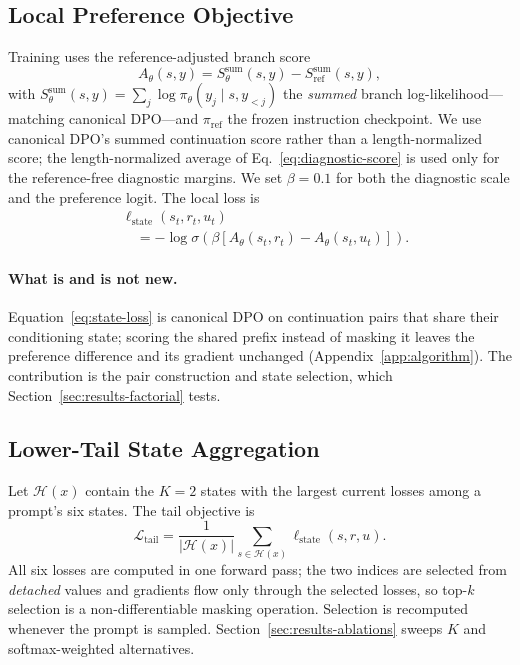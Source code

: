 \documentclass[11pt]{article}
\newcommand{\Ssum}[1]{S^{\mathrm{sum}}_{#1}}
\begin{document}
\subsection{Local Preference Objective}
\label{sec:local-objective}

Training uses the reference-adjusted branch score
\begin{equation}
  A_\theta(s,y) = \Ssum{\theta}(s,y)-\Ssum{\mathrm{ref}}(s,y),
  \label{eq:training-score}
\end{equation}
with \(\Ssum{\theta}(s,y)=\sum_{j}\log\pi_\theta(y_j\mid s,y_{<j})\) the
\emph{summed} branch log-likelihood---matching canonical DPO---and
\(\pi_{\mathrm{ref}}\) the frozen instruction checkpoint. We use canonical
DPO's summed continuation score rather than a length-normalized score; the
length-normalized average of Eq.~\eqref{eq:diagnostic-score} is used only for
the reference-free diagnostic margins. We set \(\beta=0.1\) for both the
diagnostic scale and the preference logit. The local loss is
\begin{equation}
  \begin{aligned}
    &\ell_{\mathrm{state}}(s_t,r_t,u_t)\\
    &\quad=
    -\log \sigma\!\left(\beta\left[A_\theta(s_t,r_t)-A_\theta(s_t,u_t)\right]\right).
  \end{aligned}
  \label{eq:state-loss}
\end{equation}

\paragraph{What is and is not new.}
Equation~\eqref{eq:state-loss} is canonical DPO on continuation pairs that share
their conditioning state; scoring the shared prefix instead of masking it leaves
the preference difference and its gradient unchanged
(Appendix~\ref{app:algorithm}). The contribution is the pair construction and
state selection, which Section~\ref{sec:results-factorial} tests.

\subsection{Lower-Tail State Aggregation}
\label{sec:tail-objective}

Let \(\mathcal{H}(x)\) contain the \(K=2\) states with the largest current
losses among a prompt's six states. The tail objective is
\begin{equation}
    \mathcal{L}_{\mathrm{tail}}
    =
    \frac{1}{|\mathcal{H}(x)|}\sum_{s\in\mathcal{H}(x)}\ell_{\mathrm{state}}(s,r,u).
  \label{eq:tail-loss}
\end{equation}
All six losses are computed in one forward pass; the two indices are selected
from \emph{detached} values and gradients flow only through the selected
losses, so top-\(k\) selection is a non-differentiable masking operation.
Selection is recomputed whenever the prompt is sampled.
Section~\ref{sec:results-ablations} sweeps \(K\) and softmax-weighted
alternatives.
\end{document}
